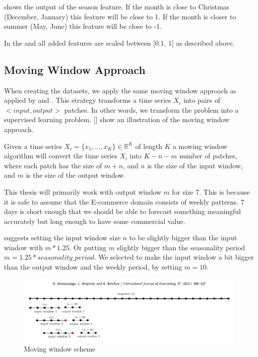  shows the output of the season feature.
If the month is close to Christmas (December, January) this feature will be close to 1.
If the month is closer to summer (May, June) this feature will be close to -1.

In the and all added features are scaled between [0.1, 1] as described above.


\subsection{Moving Window Approach}
\label{section:Data:Preprocessing:moving-window-approach}
When creating the datasets, we apply the same moving window approach as applied by \cite{Bandara2019} and \cite{Hewamalage2021}.
This strategy transforms a time series $X_i$ into pairs of $<input, output>$ patches.
In other words, we transform the problem into a supervised learning problem.
  [] show an illustration of the moving window approach.

Given a time series $X_i = \{x_1, ..., x_K\} \in \mathbb{R}^K$ of length $K$ a mowing
window algorithm will convert the time series $X_i$ into $K-n-m$ number of patches,
where each patch has the size of $m+n$, and $n$ is the size of the input window,
and $m$ is the size of the output window.

This thesis will primarily work with output window $m$ for size 7.
This is because it is safe to assume that the E-commerce domain consists of weekly patterns.
7 days is short enough that we should be able to forecast something meaningful accurately
but long enough to have some commercial value.

\cite{Hewamalage2021} suggests setting the input window size $n$ to be slightly
bigger than the input window with $m * 1.25$. Or putting $m$ slightly bigger than
the seasonality period $m = 1.25 * seasonality\_period$.
We selected to make the input window a bit bigger than the output window and the weekly
period, by setting $m = 10$.
\begin{figure}[h!]
  \centering
  \includegraphics[width=\textwidth]{./figs/illustrations/moving_window_illustration.png}
  \hfill
  \caption{Moving window scheme \citep{Hewamalage2021}}
  \label{fig:dataset:moving_window_scheme}
\end{figure}



